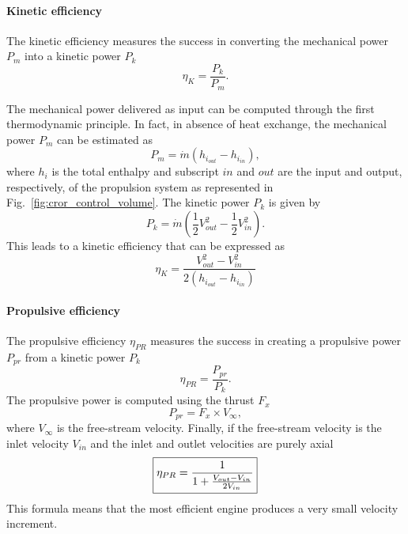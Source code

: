 \paragraph{Kinetic efficiency}
The kinetic efficiency measures the success in converting the mechanical
power $P_m$ into a kinetic power $P_k$
\begin{equation}
	\eta_K = \frac{P_k}{P_m}.
\end{equation}

The mechanical power delivered as input
can be computed through the first thermodynamic principle. In fact, in absence
of heat exchange, the mechanical power $P_m$ can be estimated as
\begin{equation}
	P_m = \dot{m} (h_{i_{out}} - h_{i_{in}}),
\end{equation}
where $h_i$ is the total enthalpy and subscript $in$ and $out$ are
the input and output, respectively, of the propulsion system as represented
in Fig.~\ref{fig:cror_control_volume}.
The kinetic power $P_k$ is given by
\begin{equation}
	P_k = \dot{m} \left(\frac{1}{2} V^2_{out} -
	\frac{1}{2} V^2_{in} \right).
\end{equation}
This leads to a kinetic efficiency that can be expressed as
\begin{equation}
	\eta_{K} = \frac{V^2_{out} - V^2_{in}}{2 (h_{i_{out}} - h_{i_{in}})}
\end{equation}

\paragraph{Propulsive efficiency}
The propulsive efficiency $\eta_{PR}$ measures the success
in creating a propulsive power $P_{pr}$ from a
kinetic power $P_k$
\begin{equation}
	\eta_{PR} = \frac{P_{pr}}{P_k}.
\end{equation}
The propulsive power is computed using the thrust $F_x$
\begin{equation}
	P_{pr} = F_x \times V_{\infty},
\end{equation}
where $V_{\infty}$ is the free-stream velocity.
Finally, if the free-stream velocity is the inlet velocity $V_{in}$
and the inlet and outlet velocities are purely axial
\begin{equation}
	\fbox{$
	\eta_{PR} = \displaystyle \frac{1}{1 + \frac{V_{out} - V_{in}}{2 V_{in}}}
	$}
	\label{eq:cror_propulsive_efficiency}
\end{equation}
This formula means that the most efficient engine produces
a very small velocity increment.

